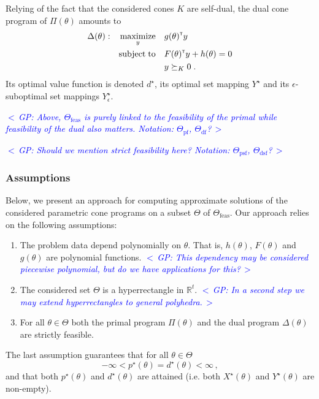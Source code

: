 \documentclass{article}
\newcommand{\R}{\mathbb{R}}        %
\renewcommand{\t}{^{\mbox{\tiny \sf T}}}    %
\newcommand{\ppar}{\theta}                  %
\newcommand{\Ppar}{\Theta}                  %
\DeclareMathOperator*{\maximize}{maximize}
\DeclareMathOperator*{\subj}{subject\;to}
\newcommand{\commentGP}[1]{\noindent \textcolor{blue}{\emph{$<\,$GP: #1$\,>$}}}%
\begin{document}
Relying of the fact that the considered cones $K$ are self-dual, the dual cone program of $\Pi(\ppar)$ amounts to
\begin{gather}\label{eq:parametric_dual}
\begin{aligned}
\Delta(\ppar): && \maximize_{y} &&& g(\ppar)\t y\\
                && \subj         &&& F(\ppar)\t y + h(\ppar)= 0\\
                &&               &&& y \succeq_K 0  \;.
\end{aligned}
\end{gather}
Its optimal value function is denoted $d^\star$, its optimal set mapping $Y^\star$ and its $\epsilon$-suboptimal set mappings $Y^\star_\epsilon$.

\commentGP{Above, $\Ppar_\text{feas}$ is purely linked to the feasibility of the primal while feasibility of the dual also matters. Notation: $\Ppar_{\text{pf}}$, $\Ppar_{\text{df}}$?}

\commentGP{Should we mention strict feasibility here? Notation: $\Ppar_{\text{psf}}$, $\Ppar_{\text{dsf}}$?}


\subsubsection*{Assumptions}

Below, we present an approach for computing approximate solutions of the considered parametric cone programs on a subset $\Ppar$ of $\Ppar_\text{feas}$. Our approach relies on the following assumptions:

\begin{enumerate}[\bf\text{A}1.]
\item\label{ass_pdep} The problem data depend polynomially on $\ppar$. That is, $h(\ppar)$, $F(\ppar)$ and $g(\ppar)$ are polynomial functions. \commentGP{This dependency may be considered piecewise polynomial, but do we have applications for this?}
\item\label{ass_Ppar} The considered set $\Ppar$ is a hyperrectangle in $\R^t$. \commentGP{In a second step we may extend hyperrectangles to general polyhedra.}
\item\label{ass_feas} For all $\ppar\in\Ppar$ both the primal program $\Pi(\ppar)$ and the dual program $\Delta(\ppar)$ are strictly feasible.
\end{enumerate}
The last assumption guarantees that for all $\ppar\in\Ppar$
\[ -\infty < p^\star(\ppar) = d^\star(\ppar) < \infty \,,%
\]
and that both $p^\star(\ppar)$ and $d^\star(\ppar)$ are attained (i.e. both $X^\star(\ppar)$ and $Y^\star(\ppar)$ are non-empty).
\end{document}

